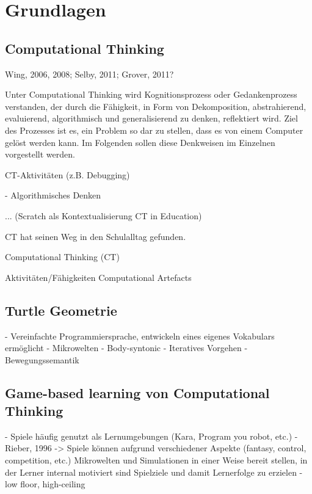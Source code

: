 \chapter{Grundlagen}

\section{Computational Thinking}

Wing, 2006, 2008; Selby, 2011; Grover, 2011?

Unter Computational Thinking wird Kognitionsprozess oder Gedankenprozess verstanden, der durch die
Fähigkeit, in Form von Dekomposition, abstrahierend, evaluierend, algorithmisch und generalisierend
zu denken, reflektiert wird. Ziel des Prozesses ist es, ein Problem so dar zu stellen, dass es von
einem Computer gelöst werden kann. Im Folgenden sollen diese Denkweisen im Einzelnen vorgestellt
werden.

CT-Aktivitäten (z.B. Debugging)

- Algorithmisches Denken

...
(Scratch als Kontextualisierung CT in Education)

CT hat seinen Weg in den Schulalltag gefunden.




Computational Thinking (CT)

Aktivitäten/Fähigkeiten
Computational Artefacts





\section{Turtle Geometrie}

- Vereinfachte Programmiersprache, entwickeln eines eigenes Vokabulars ermöglicht
- Mikrowelten
- Body-syntonic
- Iteratives Vorgehen
- Bewegungssemantik


\section{Game-based learning von Computational Thinking}

- Spiele häufig genutzt als Lernumgebungen (Kara, Program you robot, etc.)
- Rieber, 1996 -> Spiele können aufgrund verschiedener Aspekte (fantasy, control, competition, etc.) Mikrowelten und Simulationen in einer Weise bereit stellen, in der Lerner internal motiviert sind Spielziele und damit Lernerfolge zu erzielen 
- low floor, high-ceiling


